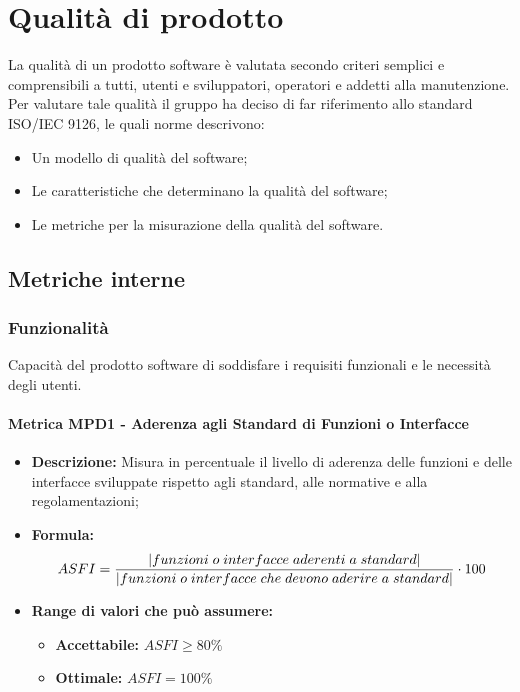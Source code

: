 \section{Qualità di prodotto}
La qualità di un prodotto software è valutata secondo criteri semplici e comprensibili a tutti, utenti e sviluppatori, operatori e addetti alla manutenzione.
Per valutare tale qualità il gruppo \Gruppo{} ha deciso di far riferimento allo standard ISO/IEC 9126, le quali norme descrivono:
\begin{itemize}
    \item Un modello di qualità del software; 
    \item Le caratteristiche che determinano la qualità del software;
    \item Le metriche per la misurazione della qualità del software.
\end{itemize}

\subsection{Metriche interne}

\subsubsection{Funzionalità}
Capacità del prodotto software di soddisfare i requisiti funzionali e le necessità degli utenti.
\paragraph{Metrica MPD1 - Aderenza agli Standard di Funzioni o Interfacce} 
\begin{itemize}
    \item \textbf{Descrizione:} Misura in percentuale il livello di aderenza delle funzioni e delle interfacce sviluppate rispetto agli standard, alle normative e alla regolamentazioni;
    \item \textbf{Formula:} $$ASFI = {|funzioni \; o \; interfacce \; aderenti \; a \; standard| \over |funzioni \; o \; interfacce \; che \; devono \; aderire \; a \; standard|} \cdot 100 $$ 
    \item \textbf{Range di valori che può assumere:}
    \begin{itemize}
        \item \textbf{Accettabile:} $ASFI \geq 80\% $
        \item \textbf{Ottimale:} $ASFI = 100\%$
    \end{itemize}
\end{itemize}
              
